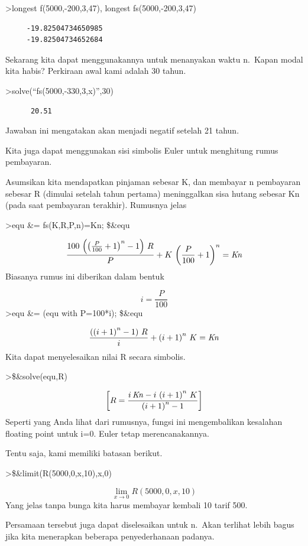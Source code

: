 \documentclass[
]{book}
\begin{document}
\textgreater longest f(5000,-200,3,47), longest fs(5000,-200,3,47)

\begin{verbatim}
     -19.82504734650985 
     -19.82504734652684 
\end{verbatim}

Sekarang kita dapat menggunakannya untuk menanyakan waktu n.~Kapan modal kita habis? Perkiraan awal kami adalah 30 tahun.

\textgreater solve(``fs(5000,-330,3,x)'',30)

\begin{verbatim}
      20.51 
\end{verbatim}

Jawaban ini mengatakan akan menjadi negatif setelah 21 tahun.

Kita juga dapat menggunakan sisi simbolis Euler untuk menghitung rumus pembayaran.

Asumsikan kita mendapatkan pinjaman sebesar K, dan membayar n pembayaran sebesar R (dimulai setelah tahun pertama) meninggalkan sisa hutang sebesar Kn (pada saat pembayaran terakhir). Rumusnya jelas

\textgreater equ \&= fs(K,R,P,n)=Kn; \$\&equ

\[\frac{100\,\left(\left(\frac{P}{100}+1\right)^{n}-1\right)\,R}{P}+K  \,\left(\frac{P}{100}+1\right)^{n}={\it Kn}\]Biasanya rumus ini diberikan dalam bentuk

\[i = \frac{P}{100}\]\textgreater equ \&= (equ with P=100*i); \$\&equ

\[\frac{\left(\left(i+1\right)^{n}-1\right)\,R}{i}+\left(i+1\right)^{  n}\,K={\it Kn}\]Kita dapat menyelesaikan nilai R secara simbolis.

\textgreater\$\&solve(equ,R)

\[\left[ R=\frac{i\,{\it Kn}-i\,\left(i+1\right)^{n}\,K}{\left(i+1  \right)^{n}-1} \right] \]Seperti yang Anda lihat dari rumusnya, fungsi ini mengembalikan kesalahan floating point untuk i=0. Euler tetap merencanakannya.

Tentu saja, kami memiliki batasan berikut.

\textgreater\$\&limit(R(5000,0,x,10),x,0)

\[\lim_{x\rightarrow 0}{R\left(5000 , 0 , x , 10\right)}\]Yang jelas tanpa bunga kita harus membayar kembali 10 tarif 500.

Persamaan tersebut juga dapat diselesaikan untuk n.~Akan terlihat lebih bagus jika kita menerapkan beberapa penyederhanaan padanya.
\end{document}
